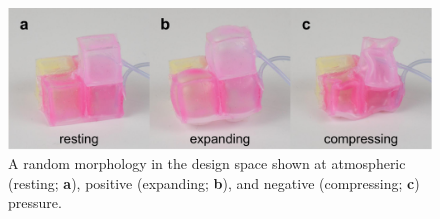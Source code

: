 
\begin{figure}[t]
    \centering
    \includegraphics[width=0.7\linewidth]{Chapter02/fig/ExpansionContraction.jpg}
    \caption{A random morphology in the design space shown at atmospheric (resting; \textbf{a}), positive (expanding; \textbf{b}), and negative (compressing; \textbf{c}) pressure.}
    \label{fig:pressure}
\end{figure}


